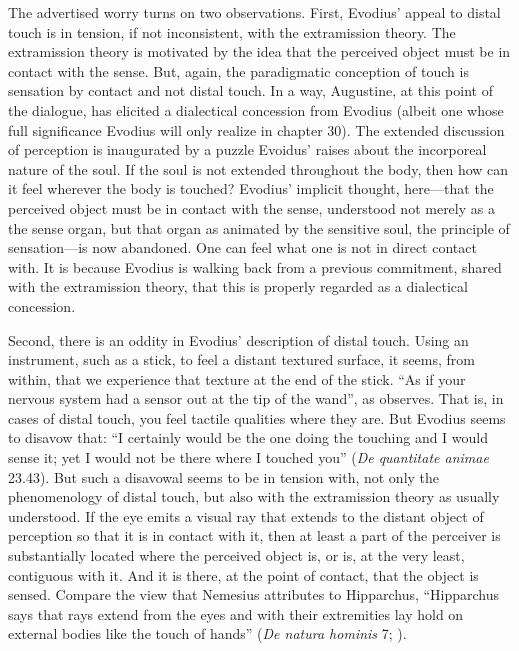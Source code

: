 \documentclass[12pt]{article}
\begin{document}
The advertised worry turns on two observations. First, Evodius' appeal to distal touch is in tension, if not inconsistent, with the extramission theory. The extramission theory is motivated by the idea that the perceived object must be in contact with the sense. But, again, the paradigmatic conception of touch is sensation by contact and not distal touch. In a way, Augustine, at this point of the dialogue, has elicited a dialectical concession from Evodius (albeit one whose full significance Evodius will only realize in chapter 30). The extended discussion of perception is inaugurated by a puzzle Evoidus' raises about the incorporeal nature of the soul. If the soul is not extended throughout the body, then how can it feel wherever the body is touched? Evodius' implicit thought, here---that the perceived object must be in contact with the sense, understood not merely as a the sense organ, but that organ as animated by the sensitive soul, the principle of sensation---is now abandoned. One can feel what one is not in direct contact with. It is because Evodius is walking back from a previous commitment, shared with the extramission theory, that this is properly regarded as a dialectical concession.

Second, there is an oddity in Evodius' description of distal touch. Using an instrument, such as a stick, to feel a distant textured surface, it seems, from within, that we experience that texture at the end of the stick. ``As if your nervous system had a sensor out at the tip of the wand'', as \citet[47]{Dennett:1993ce} observes. That is, in cases of distal touch, you feel tactile qualities where they are. But Evodius seems to disavow that: ``I certainly would be the one doing the touching and I would sense it; yet I would not be there where I touched you'' (\emph{De quantitate animae} 23.43). But such a disavowal seems to be in tension with, not only the phenomenology of distal touch, but also with the extramission theory as usually understood. If the eye emits a visual ray that extends to the distant object of perception so that it is in contact with it, then at least a part of the perceiver is substantially located where the perceived object is, or is, at the very least, contiguous with it. And it is there, at the point of contact, that the object is sensed. Compare the view that Nemesius attributes to Hipparchus, ``Hipparchus says that rays extend from the eyes and with their extremities lay hold on external bodies like the touch of hands'' (\emph{De natura hominis} 7; \citealt[104]{Sharples:2008aa}).
 
\end{document}
